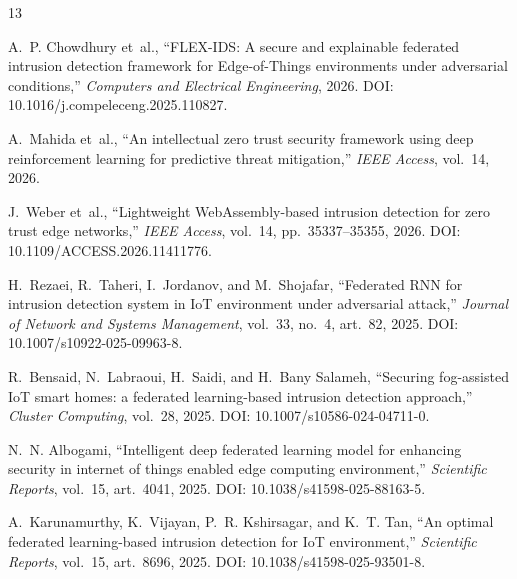\documentclass[11pt,a4paper]{article}
\begin{document}
\begin{thebibliography}{13}
\raggedright

A.~P. Chowdhury et~al.,
``FLEX-IDS: A secure and explainable federated intrusion detection framework
for Edge-of-Things environments under adversarial conditions,''
\emph{Computers and Electrical Engineering}, 2026.
DOI: 10.1016/j.compeleceng.2025.110827.

A.~Mahida et~al.,
``An intellectual zero trust security framework using deep reinforcement
learning for predictive threat mitigation,''
\emph{IEEE Access}, vol.~14, 2026.

J.~Weber et~al.,
``Lightweight WebAssembly-based intrusion detection for zero trust edge
networks,''
\emph{IEEE Access}, vol.~14, pp.~35337--35355, 2026.
DOI: 10.1109/ACCESS.2026.11411776.

H.~Rezaei, R.~Taheri, I.~Jordanov, and M.~Shojafar,
``Federated RNN for intrusion detection system in IoT environment under
adversarial attack,''
\emph{Journal of Network and Systems Management}, vol.~33, no.~4, art.~82,
2025. DOI: 10.1007/s10922-025-09963-8.

R.~Bensaid, N.~Labraoui, H.~Saidi, and H.~Bany Salameh,
``Securing fog-assisted IoT smart homes: a federated learning-based
intrusion detection approach,''
\emph{Cluster Computing}, vol.~28, 2025.
DOI: 10.1007/s10586-024-04711-0.

N.~N. Albogami,
``Intelligent deep federated learning model for enhancing security in
internet of things enabled edge computing environment,''
\emph{Scientific Reports}, vol.~15, art.~4041, 2025.
DOI: 10.1038/s41598-025-88163-5.

A.~Karunamurthy, K.~Vijayan, P.~R. Kshirsagar, and K.~T. Tan,
``An optimal federated learning-based intrusion detection for IoT
environment,''
\emph{Scientific Reports}, vol.~15, art.~8696, 2025.
DOI: 10.1038/s41598-025-93501-8.


\end{thebibliography}
\end{document}
